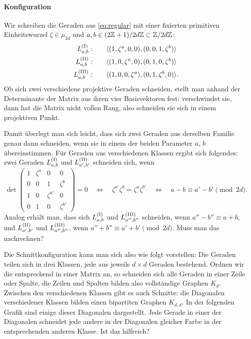 \paragraph{Konfiguration} Wir schreiben die Geraden aus \eqref{eq:regular} mit einer fixierten primitiven Einheitswurzel $\zeta \in \mu_{2d}$ und $a,b \in (2\mathbb Z + 1)/2d\mathbb Z \subset \Zmod 2dZ$:
\begin{equation}
\begin{split}
\Lcl(I)_{a,b}  :\qquad	&\langle (1,\zeta^a,0,0), (0,0,1,\zeta^b)\rangle \\
\Lcl(II)_{a,b} :\qquad	&\langle (1,0,\zeta^a,0), (0,1,0,\zeta^b)\rangle \\
\Lcl(III)_{a,b}:\qquad	&\langle (1,0,0,\zeta^a), (0,1,\zeta^b,0)\rangle.
\end{split}
\end{equation}
Ob sich zwei verschiedene projektive Geraden schneiden, stellt man anhand der Determinante der Matrix aus ihren vier Basisvektoren fest: verschwindet sie, dann hat die Matrix nicht vollen Rang, also schneiden sie sich in einem projektiven Punkt.

Damit überlegt man sich leicht, dass sich zwei Geraden aus derselben Familie genau dann schneiden, wenn sie in einem der beiden Parameter $a$, $b$ übereinstimmen. Für Geraden aus verschiedenen Klassen ergibt sich folgendes: zwei Geraden $\Lcl(I)_{a,b}$ und $\Lcl(II)_{a',b'}$ schneiden sich, wenn
\begin{equation}
\det \begin{pmatrix}
1 & \zeta^a & 0 & 0 \\
0 & 0 & 1 & \zeta^b \\
1 & 0 & \zeta^{a'} & 0 \\
0 & 1 & 0 & \zeta^{b'}
\end{pmatrix} = 0 \quad\Longleftrightarrow\quad \zeta^{a'} \zeta^b = \zeta^a \zeta^{b'} \quad\Leftrightarrow\quad a-b \equiv a'-b' \pmod{2d}.
\end{equation}
Analog erhält man, dass sich $\Lcl(I)_{a,b}$ und $\Lcl(III)_{a'',b''}$ schneiden, wenn $a''-b'' \equiv a+b$, und $\Lcl(II)_{a',b'}$ und $\Lcl(III)_{a'',b''}$, wenn $a''+b'' \equiv a'+b' \pmod{2d}$. \note Muss man das nachrechnen?

Die Schnittkonfiguration kann man sich also wie folgt vorstellen: Die Geraden teilen sich in drei Klassen, jede aus jeweils $d \times d$ Geraden bestehend. Ordnen wir die entsprechend in einer Matrix an, so schneiden sich alle Geraden in einer Zeile oder Spalte, die Zeilen und Spalten bilden also vollständige Graphen $K_d$. Zwischen den verschiedenen Klassen gibt es auch Schnitte: die Diagonalen verschiedener Klassen bilden einen bipartiten Graphen $K_{d,d}$. In der folgenden Grafik sind einige dieser Diagonalen dargestellt. Jede Gerade in einer der Diagonalen schneidet jede andere in der Diagonalen gleicher Farbe in der entsprechenden anderen Klasse. \note Ist das hilfreich?

